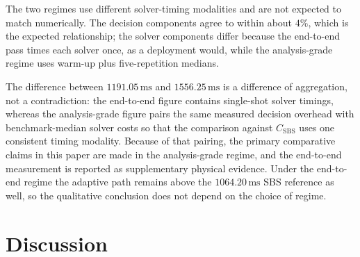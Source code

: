 \documentclass[conference]{IEEEtran}
\begin{document}
\begin{table}[t]
\caption{Cost-Regime Reconciliation at $Q=500$ (8 Test Graphs, 4,000 Queries)}
\label{tab:regime}
\centering
{}
\vspace{0.4ex}
\raggedright
\scriptsize The two regimes use different solver-timing modalities and are not expected to match numerically. The decision components agree to within about $4\%$, which is the expected relationship; the solver components differ because the end-to-end pass times each solver once, as a deployment would, while the analysis-grade regime uses warm-up plus five-repetition medians.
\end{table}

The difference between $1191.05\,\mathrm{ms}$ and $1556.25\,\mathrm{ms}$ is a difference of aggregation, not a contradiction: the end-to-end figure contains single-shot solver timings, whereas the analysis-grade figure pairs the same measured decision overhead with benchmark-median solver costs so that the comparison against $C_{\mathrm{SBS}}$ uses one consistent timing modality. Because of that pairing, the primary comparative claims in this paper are made in the analysis-grade regime, and the end-to-end measurement is reported as supplementary physical evidence. Under the end-to-end regime the adaptive path remains above the $1064.20\,\mathrm{ms}$ SBS reference as well, so the qualitative conclusion does not depend on the choice of regime.

\section{Discussion}
\end{document}
